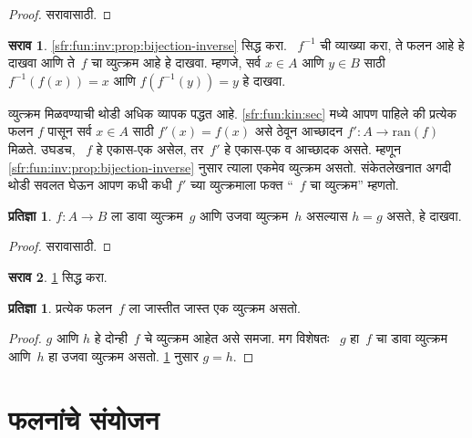 \documentclass[11pt,a4paper,openany]{book}
\theoremstyle{definition}
\newtheorem{prop}[defn]{प्रतिज्ञा}
\newtheorem{prob}{सराव}[chapter]
\newenvironment{explain}{}{}
\newcommand{\ran}[1]{\mathrm{ran}(#1)}
\begin{document}
\begin{proof}
सरावासाठी.
\end{proof}

\begin{prob}
\ref{sfr:fun:inv:prop:bijection-inverse} सिद्ध करा. ~$f^{-1}$ ची
व्याख्या करा, ते फलन आहे हे दाखवा आणि ते~$f$ चा व्युत्क्रम आहे हे
दाखवा. म्हणजे, सर्व $x \in A$ आणि $y \in B$ साठी
$f^{-1}(f(x)) = x$ आणि $f(f^{-1}(y)) = y$ हे दाखवा.
\end{prob}

\begin{explain}
व्युत्क्रम मिळवण्याची थोडी अधिक व्यापक पद्धत आहे. \ref{sfr:fun:kin:sec}
मध्ये आपण पाहिले की प्रत्येक फलन $f$ पासून सर्व $x \in A$ साठी
$f'(x) = f(x)$ असे ठेवून आच्छादन $f' \colon A \to \ran{f}$
मिळते. उघडच, ~$f$ हे एकास-एक असेल, तर~$f'$ हे एकास-एक व आच्छादक
असते. म्हणून \ref{sfr:fun:inv:prop:bijection-inverse} नुसार त्याला एकमेव
व्युत्क्रम असतो. संकेतलेखनात अगदी थोडी सवलत घेऊन आपण कधी कधी
$f'$ च्या व्युत्क्रमाला फक्त ``~$f$ चा व्युत्क्रम'' म्हणतो.
\end{explain}

\begin{prop}\label{sfr:fun:inv:prop:left-right}%
  $f\colon A \to B$ ला डावा व्युत्क्रम~$g$ आणि उजवा व्युत्क्रम~$h$
  असल्यास $h = g$ असते, हे दाखवा.
\end{prop}

\begin{proof}
  सरावासाठी.
\end{proof}

\begin{prob}
  \ref{sfr:fun:inv:prop:left-right} सिद्ध करा.
\end{prob}

\begin{prop}\label{sfr:fun:inv:prop:inverse-unique}
प्रत्येक फलन~$f$ ला जास्तीत जास्त एक व्युत्क्रम असतो.
\end{prop}

\begin{proof}
  $g$ आणि $h$ हे दोन्ही~$f$ चे व्युत्क्रम आहेत असे समजा. मग विशेषतः
  ~$g$ हा~$f$ चा डावा व्युत्क्रम आणि~$h$ हा उजवा व्युत्क्रम असतो.
  \ref{sfr:fun:inv:prop:left-right} नुसार $g = h$.
\end{proof}








\section{फलनांचे संयोजन}\label{sfr:fun:cmp:sec}
\end{document}
